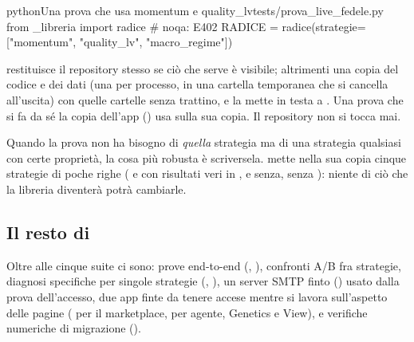 \begin{codiceInterno}{python}{Una prova che usa momentum e quality\_lv}{tests/prova\_live\_fedele.py}
from _libreria import radice  # noqa: E402
RADICE = radice(strategie=["momentum", "quality_lv", "macro_regime"])
\end{codiceInterno}

\noindent
{} restituisce il repository stesso se ciò che serve è
visibile; altrimenti una copia del codice e dei dati (una per processo, in
una cartella temporanea che si cancella all'uscita) con quelle cartelle senza
trattino, e la mette in testa a . Una prova che si fa da sé la
copia dell'app () usa
 sulla sua copia. Il repository non si tocca mai.

\noindent
Quando la prova non ha bisogno di \emph{quella} strategia ma di una strategia
qualsiasi con certe proprietà, la cosa più robusta è scriversela.
 mette nella sua copia cinque strategie di poche
righe ( e  con risultati veri in ,
 e  senza,  senza
): niente di ciò che la libreria diventerà potrà
cambiarle.

\subsection{Il resto di }

Oltre alle cinque suite ci sono: prove end-to-end (,
), confronti A/B fra strategie, diagnosi
specifiche per singole strategie (,
), un server SMTP finto
() usato dalla prova dell'accesso, due app finte da
tenere accese mentre si lavora sull'aspetto delle pagine
( per il marketplace,  per
agente, Genetics e View), e verifiche numeriche di migrazione
().
